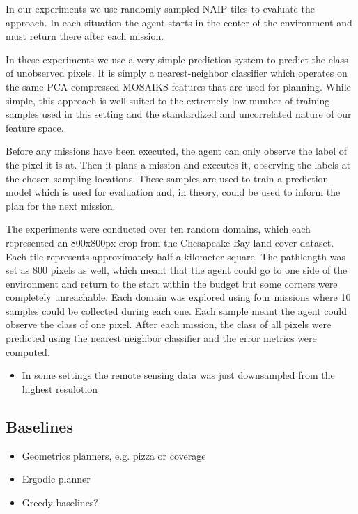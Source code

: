 In our experiments we use randomly-sampled NAIP tiles to evaluate the approach. In each situation the agent starts in the center of the environment and must return there after each mission.

In these experiments we use a very simple prediction system to predict the class of unobserved pixels. It is simply a nearest-neighbor classifier which operates on the same PCA-compressed MOSAIKS features that are used for planning. While simple, this approach is well-suited to the extremely low number of training samples used in this setting and the standardized and uncorrelated nature of our feature space.

Before any missions have been executed, the agent can only observe the label of the pixel it is at. Then it plans a mission and executes it, observing the labels at the chosen sampling locations. These samples are used to train a prediction model which is used for evaluation and, in theory, could be used to inform the plan for the next mission. 


The experiments were conducted over ten random domains, which each represented an 800x800px crop from the Chesapeake Bay land cover dataset. Each tile represents approximately half a kilometer square. The pathlength was set as 800 pixels as well, which meant that the agent could go to one side of the environment and return to the start within the budget but some corners were completely unreachable. Each domain was explored using four missions where 10 samples could be collected during each one. Each sample meant the agent could observe the class of one pixel. After each mission, the class of all pixels  were predicted using the nearest neighbor classifier and the error metrics were computed. 


\begin{itemize}
    \item In some settings the remote sensing data was just downsampled from the highest resulotion 
\end{itemize}

\subsection{Baselines}
\begin{itemize}
    \item Geometrics planners, e.g. pizza or coverage 
    \item Ergodic planner \cite{Rao}
    \item Greedy baselines?
\end{itemize}

